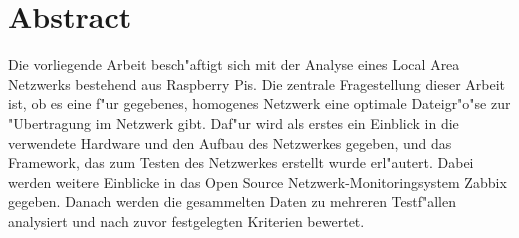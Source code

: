 \pagestyle{empty} %


\chapter*{Abstract} %
\label{cha:abtract}

Die vorliegende Arbeit besch"aftigt sich mit der Analyse eines Local %
Area Netzwerks bestehend aus Raspberry Pis. Die zentrale Fragestellung %
dieser Arbeit ist, ob es eine f"ur gegebenes, homogenes Netzwerk %
eine optimale Dateigr"o"se zur "Ubertragung im Netzwerk gibt. %
Daf"ur wird als erstes ein Einblick in die verwendete Hardware und den %
Aufbau des Netzwerkes gegeben, und das Framework, das zum Testen des Netzwerkes erstellt wurde erl"autert. %
Dabei werden weitere %
Einblicke in das Open Source Netzwerk-Monitoringsystem Zabbix gegeben. %
Danach werden die gesammelten Daten zu mehreren Testf"allen analysiert und %
nach zuvor festgelegten Kriterien bewertet. %
